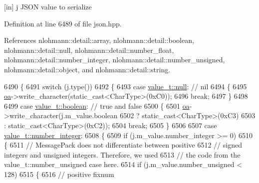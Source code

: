 \mbox{[}in\mbox{]} j J\+S\+ON value to serialize 



Definition at line 6489 of file json.\+hpp.



References nlohmann\+::detail\+::array, nlohmann\+::detail\+::boolean, nlohmann\+::detail\+::null, nlohmann\+::detail\+::number\+\_\+float, nlohmann\+::detail\+::number\+\_\+integer, nlohmann\+::detail\+::number\+\_\+unsigned, nlohmann\+::detail\+::object, and nlohmann\+::detail\+::string.


\begin{DoxyCode}
6490     \{
6491         \textcolor{keywordflow}{switch} (j.type())
6492         \{
6493             \textcolor{keywordflow}{case} \hyperlink{namespacenlohmann_1_1detail_a1ed8fc6239da25abcaf681d30ace4985a37a6259cc0c1dae299a7866489dff0bd}{value\_t::null}: \textcolor{comment}{// nil}
6494             \{
6495                 \hyperlink{classnlohmann_1_1detail_1_1binary__writer_a6f15b782a7900f50ef37d123008e601b}{oa}->write\_character(static\_cast<CharType>(0xC0));
6496                 \textcolor{keywordflow}{break};
6497             \}
6498 
6499             \textcolor{keywordflow}{case} \hyperlink{namespacenlohmann_1_1detail_a1ed8fc6239da25abcaf681d30ace4985a84e2c64f38f78ba3ea5c905ab5a2da27}{value\_t::boolean}: \textcolor{comment}{// true and false}
6500             \{
6501                 \hyperlink{classnlohmann_1_1detail_1_1binary__writer_a6f15b782a7900f50ef37d123008e601b}{oa}->write\_character(j.m\_value.boolean
6502                                     ? static\_cast<CharType>(0xC3)
6503                                     : static\_cast<CharType>(0xC2));
6504                 \textcolor{keywordflow}{break};
6505             \}
6506 
6507             \textcolor{keywordflow}{case} \hyperlink{namespacenlohmann_1_1detail_a1ed8fc6239da25abcaf681d30ace4985a5763da164f8659d94a56e29df64b4bcc}{value\_t::number\_integer}:
6508             \{
6509                 \textcolor{keywordflow}{if} (j.m\_value.number\_integer >= 0)
6510                 \{
6511                     \textcolor{comment}{// MessagePack does not differentiate between positive}
6512                     \textcolor{comment}{// signed integers and unsigned integers. Therefore, we used}
6513                     \textcolor{comment}{// the code from the value\_t::number\_unsigned case here.}
6514                     \textcolor{keywordflow}{if} (j.m\_value.number\_unsigned < 128)
6515                     \{
6516                         \textcolor{comment}{// positive fixnum}

\end{DoxyCode}
